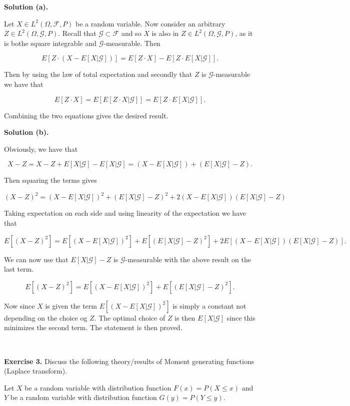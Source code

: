 \documentclass[
]{book}
\begin{document}
\textbf{Solution (a).}

Let \(X\in L^2(\Omega,\mathcal{F},P)\) be a random variable. Now consider an arbitrary \(Z\in L^2(\Omega,\mathcal{G},P)\). Recall that \(\mathcal{G}\subset \mathcal{F}\) and so \(X\) is also in \(Z\in L^2(\Omega,\mathcal{G},P)\), as it is bothe square integrable and \(\mathcal{G}\)-measurable. Then

\[E\left[Z\cdot(X-E[X\vert\mathcal{G}])\right]=E\left[Z\cdot X\right]-E\left[Z\cdot E[X\vert\mathcal{G}]\right].\]

Then by using the law of total expectation and secondly that \(Z\) is \(\mathcal{G}\)-measurable we have that

\[E\left[Z\cdot X\right]=E\left[E[Z\cdot X\vert\mathcal{G}]\right]=E\left[Z\cdot E[ X\vert\mathcal{G}]\right].\]

Combining the two equations gives the desired result.

\textbf{Solution (b).}

Obviously, we have that

\[X-Z=X-Z+E[X\vert\mathcal{G}]-E[X\vert\mathcal{G}]=(X-E[X\vert\mathcal{G}])+(E[X\vert\mathcal{G}]-Z).\]

Then squaring the terms gives

\[(X-Z)^2=(X-E[X\vert\mathcal{G}])^2+(E[X\vert\mathcal{G}]-Z)^2+2(X-E[X\vert\mathcal{G}])(E[X\vert\mathcal{G}]-Z)\]

Taking expectation on each side and using linearity of the expectation we have that

\[E[(X-Z)^2]=E\left[(X-E[X\vert\mathcal{G}])^2\right]+E\left[(E[X\vert\mathcal{G}]-Z)^2\right]+2E\left[(X-E[X\vert\mathcal{G}])(E[X\vert\mathcal{G}]-Z)\right].\]

We can now use that \(E[X\vert\mathcal{G}]-Z\) is \(\mathcal{G}\)-measurable with the above result on the last term.

\[E[(X-Z)^2]=E\left[(X-E[X\vert\mathcal{G}])^2\right]+E\left[(E[X\vert\mathcal{G}]-Z)^2\right].\]

Now since \(X\) is given the term \(E\left[(X-E[X\vert\mathcal{G}])^2\right]\) is simply a constant not depending on the choice og \(Z\). The optimal choice of \(Z\) is then \(E[X\vert\mathcal{G}]\) since this minimizes the second term. The statement is then proved.

~

\textbf{Exercise 3.} Discuss the following theory/results of Moment generating functions (Laplace transform).

Let \(X\) be a random variable with distribution function \(F(x)=P(X\le x)\) and \(Y\) be a random variable with distribution function \(G(y)=P(Y\le y)\).
\end{document}
